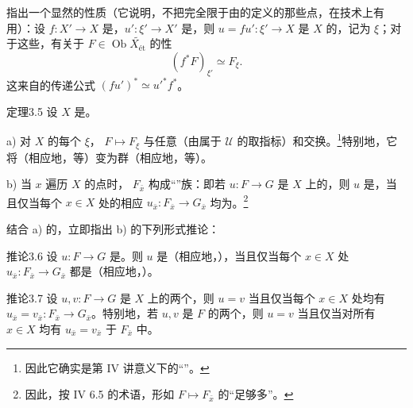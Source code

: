 指出一个显然的性质（它说明，不把完全限于由的定义的那些点，在技术上有用）：设 $f:X'\to X$ 是，$u':\xi'\to X'$ 是，则 $u=fu':\xi'\to X$ 是 $X$ 的，记为 $\xi$；对于这些，有关于 $F\in\operatorname{Ob}\widetilde{X_{\text{ét}}}$ 的性
\[(f^*F)_{\xi'}\simeq F_\xi.\]
这来自的传递公式 $(fu')^*\simeq u'^*f^*$。
\begin{SGAresult}{定理}{3.5}
设 $X$ 是。
\par a) 对 $X$ 的每个 $\xi$， $F\mapsto F_\xi$ 与任意（由属于 $\mathcal U$ 的取指标）和交换。\footnote{因此它确实是第 IV 讲意义下的“”。}特别地，它将（相应地，等）变为群（相应地，等）。
\par b) 当 $x$ 遍历 $X$ 的点时， $F_{\bar x}$ 构成“”族：即若 $u:F\to G$ 是 $X$ 上的，则 $u$ 是，当且仅当每个 $x\in X$ 处的相应 $u_{\bar x}:F_{\bar x}\to G_{\bar x}$ 均为。\footnote{因此，按 IV 6.5 的术语，形如 $F\mapsto F_{\bar x}$ 的“足够多”。}
\end{SGAresult}
结合 a) 的，立即指出 b) 的下列形式推论：
\begin{SGAresult}{推论}{3.6}
设 $u:F\to G$ 是。则 $u$ 是（相应地，），当且仅当每个 $x\in X$ 处 $u_{\bar x}:F_{\bar x}\to G_{\bar x}$ 都是（相应地，）。
\end{SGAresult}
\begin{SGAresult}{推论}{3.7}
设 $u,v:F\to G$ 是 $X$ 上的两个，则 $u=v$ 当且仅当每个 $x\in X$ 处均有 $u_{\bar x}=v_{\bar x}:F_{\bar x}\to G_{\bar x}$。特别地，若 $u,v$ 是 $F$ 的两个，则 $u=v$ 当且仅当对所有 $x\in X$ 均有 $u_{\bar x}=v_{\bar x}$ 于 $F_{\bar x}$ 中。
\end{SGAresult}
